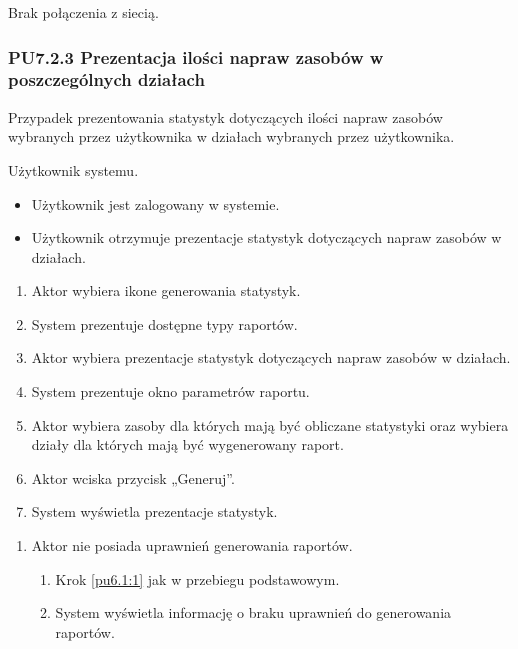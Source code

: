 Brak połączenia z siecią.

\subsubsection{PU7.2.3 Prezentacja ilości napraw zasobów w poszczególnych działach}
Przypadek prezentowania statystyk dotyczących ilości napraw zasobów wybranych przez użytkownika w działach wybranych przez użytkownika.

Użytkownik systemu.

\begin{itemize}
\item Użytkownik jest zalogowany w systemie.
\end{itemize}

\begin{itemize}
\item Użytkownik otrzymuje prezentacje statystyk dotyczących napraw zasobów w działach.
\end{itemize}

\begin{enumerate}
	\item \label{pu7.2.3:1} Aktor wybiera ikone generowania statystyk.
	\item System prezentuje dostępne typy raportów.
	\item \label{pu7.2.3:2} Aktor wybiera prezentacje statystyk dotyczących napraw zasobów w działach.
	\item System prezentuje okno parametrów raportu.
	\item Aktor wybiera zasoby dla których mają być obliczane statystyki oraz wybiera działy dla których mają być wygenerowany raport.
	\item Aktor wciska przycisk „Generuj”.
	\item System wyświetla prezentacje statystyk.
\end{enumerate}

\begin{enumerate}
	\item Aktor nie posiada uprawnień generowania raportów.
	\begin{enumerate}[label*=\arabic*.]
		\item Krok \ref{pu6.1:1} jak w przebiegu podstawowym.
		\item System wyświetla informację o braku uprawnień do generowania raportów.
	\end{enumerate}
\end{enumerate}

